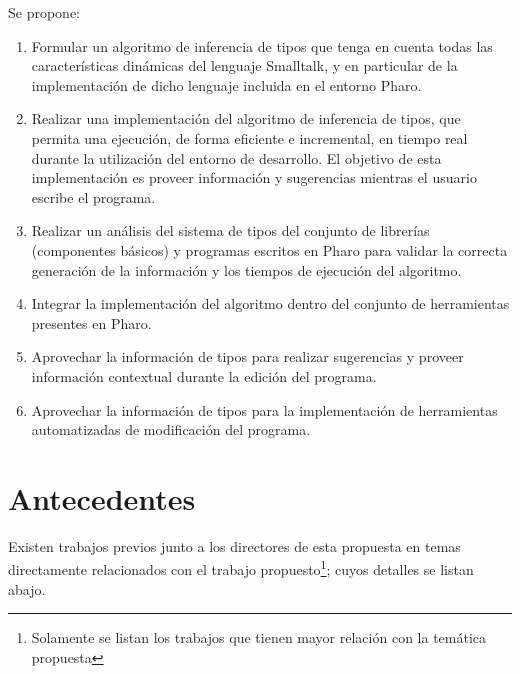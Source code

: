 \documentclass[a4paper,10pt]{article}
\begin{document}
Se propone:

\begin{enumerate}
 \item Formular un algoritmo de inferencia de tipos que tenga en cuenta todas las características dinámicas del lenguaje Smalltalk, y en particular de la implementación de dicho lenguaje incluida en el entorno Pharo.
 
 \item Realizar una implementación del algoritmo de inferencia de tipos, que permita una ejecución, de forma eficiente e incremental, en tiempo real durante la utilización del entorno de desarrollo. El objetivo de esta implementación es proveer información y sugerencias mientras el usuario escribe el programa.
 
 \item Realizar un análisis del sistema de tipos del conjunto de librerías (componentes básicos) y programas escritos en Pharo para validar la correcta generación de la información y los tiempos de ejecución del algoritmo.
 
 \item Integrar la implementación del algoritmo dentro del conjunto de herramientas presentes en Pharo.
 
 \item Aprovechar la información de tipos para realizar sugerencias y proveer información contextual durante la edición del programa.

 \item Aprovechar la información de tipos para la implementación de herramientas automatizadas de modificación del programa. 
\end{enumerate}


\section{Antecedentes}

Existen trabajos previos junto a los directores de esta propuesta en temas directamente relacionados con el trabajo propuesto\footnote{Solamente se listan los trabajos que tienen mayor relación con la temática propuesta}; cuyos detalles se listan abajo.
\end{document}
